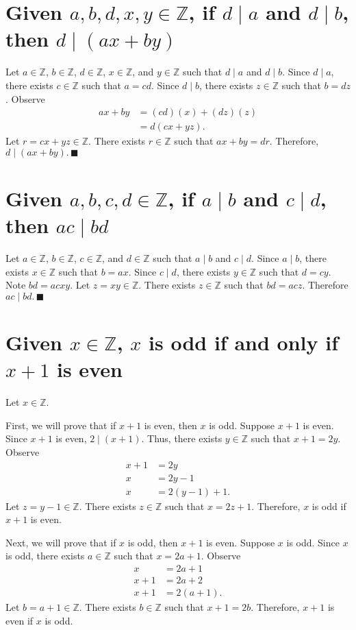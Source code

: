 \documentclass[12pt]{article}
\begin{document}
\section{Given $a,b,d,x,y\in\mathbb{Z}$, if $d \mid a$ and $d \mid b$, then $d \mid (ax+by)$}
Let $a\in\mathbb{Z}$, $b\in\mathbb{Z}$, $d\in\mathbb{Z}$, $x\in\mathbb{Z}$, and $y\in\mathbb{Z}$ such that $d \mid a$ and $d \mid b$. Since $d \mid a$, there exists $c\in\mathbb{Z}$ such that $a=cd$. Since $d \mid b$, there exists $z\in\mathbb{Z}$ such that $b=dz$. Observe
\begin{align*}
ax+by
&=(cd)(x)+(dz)(z)\\
&=d(cx+yz).
\end{align*}
Let $r=cx+yz\in\mathbb{Z}$. There exists $r\in\mathbb{Z}$ such that $ax+by=dr$. Therefore, $d \mid (ax+by).\,\blacksquare$
\section{Given $a,b,c,d\in\mathbb{Z}$, if $a \mid b$ and $c \mid d$, then $ac \mid bd$}
Let $a\in\mathbb{Z}$, $b\in\mathbb{Z}$, $c\in\mathbb{Z}$, and $d\in\mathbb{Z}$ such that $a \mid b$ and $c \mid d$. Since $a \mid b$, there exists $x\in\mathbb{Z}$ such that $b=ax$. Since $c \mid d$, there exists $y\in\mathbb{Z}$ such that $d=cy$. Note $bd=acxy$. Let $z=xy\in\mathbb{Z}$. There exists $z\in\mathbb{Z}$ such that $bd=acz$. Therefore $ac \mid bd.\,\blacksquare$
\section{Given $x\in\mathbb{Z}$, $x$ is odd if and only if $x+1$ is even}
Let $x\in\mathbb{Z}$.

First, we will prove that if $x+1$ is even, then $x$ is odd. Suppose $x+1$ is even. Since $x+1$ is even, $2 \mid (x+1)$. Thus, there exists $y\in\mathbb{Z}$ such that $x+1=2y$. Observe
\begin{align*}
x+1&=2y\\
x&=2y-1\\
x&=2(y-1)+1.
\end{align*}
Let $z=y-1\in\mathbb{Z}$. There exists $z\in\mathbb{Z}$ such that $x=2z+1$. Therefore, $x$ is odd if $x+1$ is even.

Next, we will prove that if $x$ is odd, then $x+1$ is even. Suppose $x$ is odd. Since $x$ is odd, there exists $a\in\mathbb{Z}$ such that $x=2a+1$. Observe
\begin{align*}
x&=2a+1\\
x+1&=2a+2\\
x+1&=2(a+1).
\end{align*}
Let $b=a+1\in\mathbb{Z}$. There exists $b\in\mathbb{Z}$ such that $x+1=2b$. Therefore, $x+1$ is even if $x$ is odd.
\end{document}
